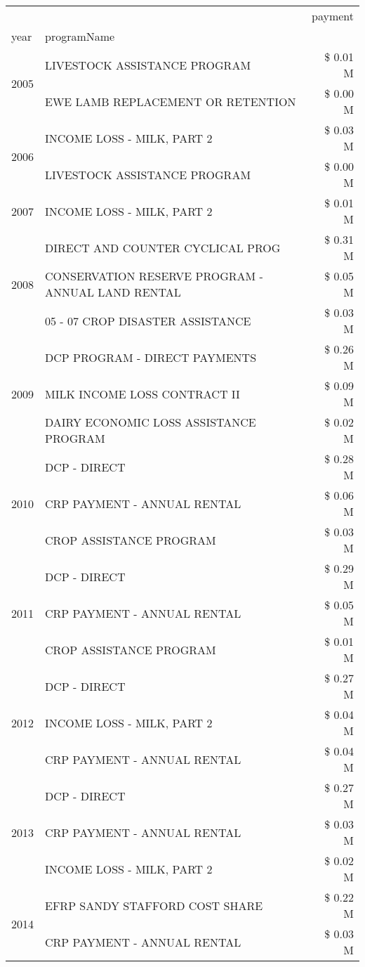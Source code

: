 \begin{tabular}{llr}
\toprule
 &  & payment \\
year & programName &  \\
\midrule
\multirow[t]{2}{*}{2005} & LIVESTOCK ASSISTANCE PROGRAM & \$ 0.01 M \\
 & EWE LAMB REPLACEMENT OR RETENTION & \$ 0.00 M \\
\cline{1-3}
\multirow[t]{2}{*}{2006} & INCOME LOSS - MILK, PART 2 & \$ 0.03 M \\
 & LIVESTOCK ASSISTANCE PROGRAM & \$ 0.00 M \\
\cline{1-3}
2007 & INCOME LOSS - MILK, PART 2 & \$ 0.01 M \\
\cline{1-3}
\multirow[t]{3}{*}{2008} & DIRECT AND COUNTER CYCLICAL PROG & \$ 0.31 M \\
 & CONSERVATION RESERVE PROGRAM - ANNUAL LAND RENTAL & \$ 0.05 M \\
 & 05 - 07 CROP DISASTER ASSISTANCE & \$ 0.03 M \\
\cline{1-3}
\multirow[t]{3}{*}{2009} & DCP PROGRAM - DIRECT PAYMENTS & \$ 0.26 M \\
 & MILK INCOME LOSS CONTRACT II & \$ 0.09 M \\
 & DAIRY ECONOMIC LOSS ASSISTANCE PROGRAM & \$ 0.02 M \\
\cline{1-3}
\multirow[t]{3}{*}{2010} & DCP - DIRECT & \$ 0.28 M \\
 & CRP PAYMENT - ANNUAL RENTAL & \$ 0.06 M \\
 & CROP ASSISTANCE PROGRAM & \$ 0.03 M \\
\cline{1-3}
\multirow[t]{3}{*}{2011} & DCP - DIRECT & \$ 0.29 M \\
 & CRP PAYMENT - ANNUAL RENTAL & \$ 0.05 M \\
 & CROP ASSISTANCE PROGRAM & \$ 0.01 M \\
\cline{1-3}
\multirow[t]{3}{*}{2012} & DCP - DIRECT & \$ 0.27 M \\
 & INCOME LOSS - MILK, PART 2 & \$ 0.04 M \\
 & CRP PAYMENT - ANNUAL RENTAL & \$ 0.04 M \\
\cline{1-3}
\multirow[t]{3}{*}{2013} & DCP - DIRECT & \$ 0.27 M \\
 & CRP PAYMENT - ANNUAL RENTAL & \$ 0.03 M \\
 & INCOME LOSS - MILK, PART 2 & \$ 0.02 M \\
\cline{1-3}
\multirow[t]{3}{*}{2014} & EFRP SANDY STAFFORD COST SHARE & \$ 0.22 M \\
 & CRP PAYMENT - ANNUAL RENTAL & \$ 0.03 M \\

\end{tabular}
